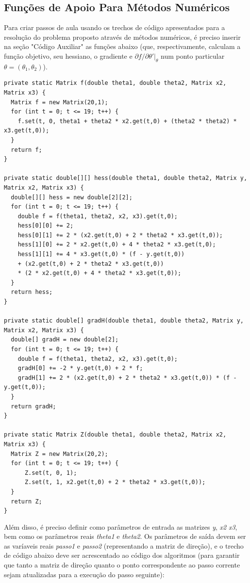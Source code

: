 \documentclass{abnt}
\newenvironment{mylisting}
{\begin{list}{}{\setlength{\leftmargin}{1em}}\item\scriptsize\bfseries}
{\end{list}}
\begin{document}
\subsection{Funções de Apoio Para Métodos Numéricos}

Para criar passos de aula usando os trechos de código apresentados para a resolução do problema proposto através de métodos numéricos, é preciso inserir na seção "Código Auxiliar" as funções abaixo (que, respectivamente, calculam a função objetivo, seu hessiano, o gradiente e $\partial f/ \partial \theta'\vert_{\theta}$ num ponto particular $\theta=(\theta_1,\theta_2)$).

\begin{mylisting}
\begin{verbatim}
private static Matrix f(double theta1, double theta2, Matrix x2, Matrix x3) {
  Matrix f = new Matrix(20,1);
  for (int t = 0; t <= 19; t++) {
    f.set(t, 0, theta1 + theta2 * x2.get(t,0) + (theta2 * theta2) * x3.get(t,0));
  }
  return f;
}

private static double[][] hess(double theta1, double theta2, Matrix y, Matrix x2, Matrix x3) {
  double[][] hess = new double[2][2];
  for (int t = 0; t <= 19; t++) {
    double f = f(theta1, theta2, x2, x3).get(t,0);
    hess[0][0] += 2;
    hess[0][1] += 2 * (x2.get(t,0) + 2 * theta2 * x3.get(t,0));
    hess[1][0] += 2 * x2.get(t,0) + 4 * theta2 * x3.get(t,0);
    hess[1][1] += 4 * x3.get(t,0) * (f - y.get(t,0))
    + (x2.get(t,0) + 2 * theta2 * x3.get(t,0))
    * (2 * x2.get(t,0) + 4 * theta2 * x3.get(t,0));
  }
  return hess;
}

private static double[] gradH(double theta1, double theta2, Matrix y, Matrix x2, Matrix x3) {
  double[] gradH = new double[2];
  for (int t = 0; t <= 19; t++) {
    double f = f(theta1, theta2, x2, x3).get(t,0);
    gradH[0] += -2 * y.get(t,0) + 2 * f;
    gradH[1] += 2 * (x2.get(t,0) + 2 * theta2 * x3.get(t,0)) * (f - y.get(t,0));
  }
  return gradH;
}

private static Matrix Z(double theta1, double theta2, Matrix x2, Matrix x3) {
  Matrix Z = new Matrix(20,2);
  for (int t = 0; t <= 19; t++) {
      Z.set(t, 0, 1);
      Z.set(t, 1, x2.get(t,0) + 2 * theta2 * x3.get(t,0));
  }
  return Z;
}
\end{verbatim}
\end{mylisting}

Além disso, é preciso definir como parâmetros de entrada as matrizes \textit{y}, \textit{x2} \textit{x3}, bem como os parâmetros reais \textit{theta1} e \textit{theta2}. Os parâmetros de saída devem ser as varíaveis reais \textit{passo1} e \textit{passo2} (representando a matriz de direção), e o trecho de código abaixo deve ser acrescentado ao código dos algoritmos (para garantir que tanto a matriz de direção quanto o ponto correspondente ao passo corrente sejam atualizadas para a execução do passo seguinte):
\end{document}
